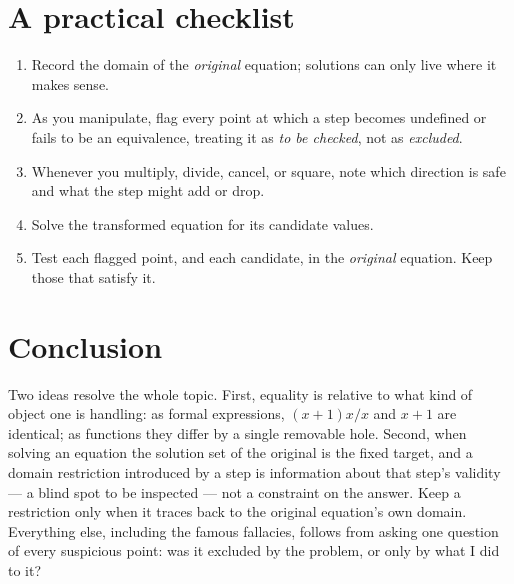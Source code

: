 \documentclass{essay}
\begin{document}
\section{A practical checklist}

\begin{enumerate}
  \item Record the domain of the \emph{original} equation; solutions can only live where it
    makes sense.
  \item As you manipulate, flag every point at which a step becomes undefined or fails to be
    an equivalence, treating it as \emph{to be checked}, not as \emph{excluded}.
  \item Whenever you multiply, divide, cancel, or square, note which direction is safe and
    what the step might add or drop.
  \item Solve the transformed equation for its candidate values.
  \item Test each flagged point, and each candidate, in the \emph{original} equation. Keep
    those that satisfy it.
\end{enumerate}

\section{Conclusion}

Two ideas resolve the whole topic. First, equality is relative to what kind of object one
is handling: as formal expressions, $(x+1)x/x$ and $x+1$ are identical; as functions they
differ by a single removable hole. Second, when solving an equation the solution set of the
original is the fixed target, and a domain restriction introduced by a step is information
about that step's validity --- a blind spot to be inspected --- not a constraint on the
answer. Keep a restriction only when it traces back to the original equation's own domain.
Everything else, including the famous fallacies, follows from asking one question of every
suspicious point: was it excluded by the problem, or only by what I did to it?
\end{document}

